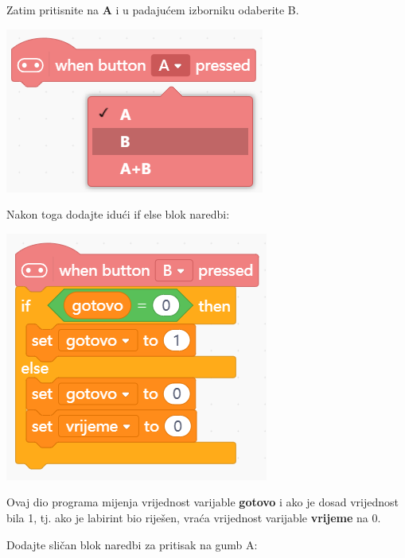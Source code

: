 \vspace{3mm}

Zatim pritisnite na \textbf{A} i u padajućem izborniku odaberite B.

\vspace{3mm}

\includegraphics[scale=0.75]{Rjesenje4.png}

\vspace{3mm}

Nakon toga dodajte idući if else blok naredbi:

\vspace{3mm}

\includegraphics[scale=0.75]{Rjesenje5.png}

\vspace{3mm}

Ovaj dio programa mijenja vrijednost varijable \textbf{gotovo} i ako je dosad vrijednost bila 1, tj. ako je labirint bio riješen, vraća vrijednost varijable \textbf{vrijeme} na 0.

Dodajte sličan blok naredbi za pritisak na gumb A:

\vspace{3mm}

